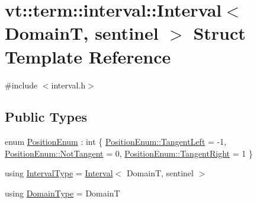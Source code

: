 \hypertarget{structvt_1_1term_1_1interval_1_1_interval}{}\section{vt\+:\+:term\+:\+:interval\+:\+:Interval$<$ DomainT, sentinel $>$ Struct Template Reference}
\label{structvt_1_1term_1_1interval_1_1_interval}


{\ttfamily \#include $<$interval.\+h$>$}

\subsection*{Public Types}
\begin{DoxyCompactItemize}
\item 
enum \hyperlink{structvt_1_1term_1_1interval_1_1_interval_adfdde0c1b12f536189432b168f6df6b3}{Position\+Enum} \+: int \{ \hyperlink{structvt_1_1term_1_1interval_1_1_interval_adfdde0c1b12f536189432b168f6df6b3a934c79ed6ebd50dae0a3f811f4627d05}{Position\+Enum\+::\+Tangent\+Left} = -\/1, 
\hyperlink{structvt_1_1term_1_1interval_1_1_interval_adfdde0c1b12f536189432b168f6df6b3ad2a5d0f2a4b974799f671c29ffc6449c}{Position\+Enum\+::\+Not\+Tangent} = 0, 
\hyperlink{structvt_1_1term_1_1interval_1_1_interval_adfdde0c1b12f536189432b168f6df6b3adca1cfdff00036253f1f3573fc12b98f}{Position\+Enum\+::\+Tangent\+Right} = 1
 \}
\item 
using \hyperlink{structvt_1_1term_1_1interval_1_1_interval_a183b53c7344a9aa51c026dfe71b57ad4}{Interval\+Type} = \hyperlink{structvt_1_1term_1_1interval_1_1_interval}{Interval}$<$ DomainT, sentinel $>$
\item 
using \hyperlink{structvt_1_1term_1_1interval_1_1_interval_a237ccc9805d839c82151945ad80b796c}{Domain\+Type} = DomainT
\end{DoxyCompactItemize}
